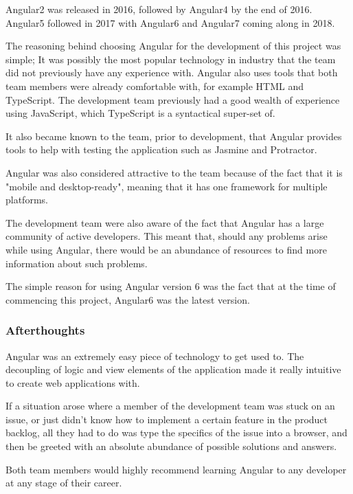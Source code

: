 \bigskip

Angular2 was released in 2016, followed by Angular4 by the end of 2016. Angular5 followed in 2017 with Angular6 and Angular7 coming along in 2018. 

\bigskip

The reasoning behind choosing Angular for the development of this project was simple; It was possibly the most popular technology in industry that the team did not previously have any experience with. Angular also uses tools that both team members were already comfortable with, for example HTML and TypeScript. The development team previously had a good wealth of experience using JavaScript, which TypeScript is a syntactical super-set of. 

It also became known to the team, prior to development, that Angular provides tools to help with testing the application such as Jasmine and Protractor. 

Angular was also considered attractive to the team because of the fact that it is "mobile and desktop-ready", meaning that it has one framework for multiple platforms. 

\bigskip

The development team were also aware of the fact that Angular has a large community of active developers. 
This meant that, should any problems arise while using Angular, there would be an abundance of resources to find more information about such problems. 

The simple reason for using Angular version 6 was the fact that at the time of commencing this project, Angular6 was the latest version.

\subsubsection{Afterthoughts}
Angular was an extremely easy piece of technology to get used to. The decoupling of logic and view elements of the application made it really intuitive to create web applications with. 

If a situation arose where a member of the development team was stuck on an issue, or just didn't know how to implement a certain feature in the product backlog, all they had to do was type the specifics of the issue into a browser, and then be greeted with an absolute abundance of possible solutions and answers. 

Both team members would highly recommend learning Angular to any developer at any stage of their career.




